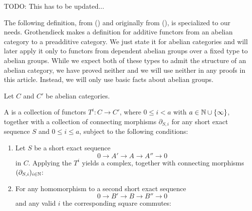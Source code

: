 TODO: This has to be updated...

The following definition, from (\cite[2.1]{tohokuTranslation}) and originally from (\cite{tohoku1957}), is specialized to our needs.
Grothendieck makes a definition for additive functors from an abelian category to a preadditive category.
We just state it for abelian categories and will later apply it only to functors from dependent abelian groups over a fixed type to abelian groups.
While we expect both of these types to admit the structure of an abelian category, we have proved neither and we will use neither in any proofs in this article.
Instead, we will only use basic facts about abelian groups.

\begin{definition}
  Let $C$ and $C'$ be abelian categories.
  
  A  is a collection of functors $T^i:C\to C'$, where $0\leq i < a$ with $a\in\mathbb{N}\cup\{\infty\}$,
  together with a collection of connecting morphisms $\partial_{S,i}$ for any short exact sequence $S$ and $0\leq i\le a$, subject to the following conditions:
  \begin{enumerate}
  \item Let $S$ be a short exact sequence
    \[ 0\to A'\to A\to A''\to 0\]
    in $C$. Applying the $T^i$ yields a complex, together with connecting morphisms $(\partial_{S,i})_{i\in\mathbb{N}}$:
    \begin{center}
    \end{center}
  \item For any homomorphism to a second short exact sequence
    \[ 0\to B'\to B\to B''\to 0\]
    and any valid $i$ the corresponding square commutes:
    \begin{center}
    \end{center}
  \end{enumerate}
\end{definition}

